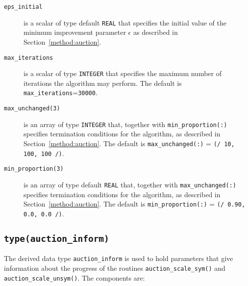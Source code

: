 \begin{description}

\item[\texttt{eps\_initial}] is a scalar of type default \texttt{REAL} that specifies the initial value of the minimum improvement parameter $\epsilon$ as described in Section~\ref{method:auction}.

\item[\texttt{max\_iterations}] is a scalar of type \texttt{INTEGER} that specifies the maximum number of iterations the algorithm may perform. The default is \texttt{max\_iterations}=\texttt{30000}.

\item[\texttt{max\_unchanged(3)}] is an array of type \texttt{INTEGER} that, together with \texttt{min\_proportion(:)} specifies termination conditions for the algorithm, as described in Section~\ref{method:auction}. The default is \texttt{max\_unchanged(:)} = \texttt{(/ 10, 100, 100 /)}.

\item[\texttt{min\_proportion(3)}] is an array of type default \texttt{REAL} that, together with \texttt{max\_unchanged(:)} specifies termination conditions for the algorithm, as described in Section~\ref{method:auction}. The default is \texttt{min\_proportion(:)} = \texttt{(/ 0.90, 0.0, 0.0 /)}.

\end{description}

\subsection{\texttt{type(auction\_inform)}} \label{type:auction_inform}

The derived data type \texttt{auction\_inform} is used to hold parameters that
give information about the progress of the routines
\texttt{auction\_scale\_sym()} and \texttt{auction\_scale\_unsym()}. The components are:

